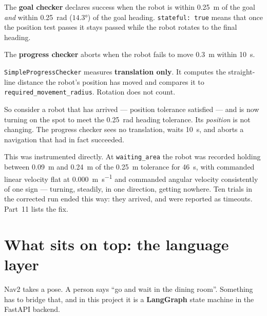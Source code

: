 \documentclass[11pt,a4paper]{report}
\newcommand{\term}[1]{\textcolor{rust}{\textbf{#1}}}
\newcommand{\file}[1]{\texttt{\small #1}}
\begin{document}
The \term{goal checker} declares success when the robot is within
\SI{0.25}{\metre} of the goal \emph{and} within \SI{0.25}{\radian}
($\ang{14.3}$) of the goal heading. \file{stateful: true} means that once the
position test passes it stays passed while the robot rotates to the final
heading.

The \term{progress checker} aborts when the robot fails to move
\SI{0.3}{\metre} within \SI{10}{\second}.

\begin{warnbox}
\file{SimpleProgressChecker} measures \textbf{translation only}. It computes
the straight-line distance the robot's position has moved and compares it to
\file{required\_movement\_radius}. Rotation does not count.

So consider a robot that has arrived --- position tolerance satisfied --- and
is now turning on the spot to meet the \SI{0.25}{\radian} heading tolerance.
Its \emph{position} is not changing. The progress checker sees no translation,
waits \SI{10}{\second}, and aborts a navigation that had in fact succeeded.

This was instrumented directly. At \file{waiting\_area} the robot was recorded
holding between \SI{0.09}{\metre} and \SI{0.24}{\metre} of the
\SI{0.25}{\metre} tolerance for \SI{46}{\second}, with commanded linear
velocity flat at \SI{0.000}{\metre\per\second} and commanded angular velocity
consistently of one sign --- turning, steadily, in one direction, getting
nowhere. Ten trials in the corrected run ended this way: they arrived, and were
reported as timeouts. Part~11 lists the fix.
\end{warnbox}

\section{What sits on top: the language layer}

Nav2 takes a pose. A person says ``go and wait in the dining room''. Something
has to bridge that, and in this project it is a \term{LangGraph} state machine
in the FastAPI backend.
\end{document}
